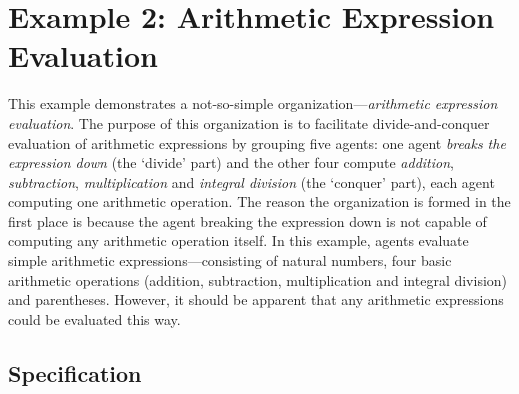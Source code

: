 
\section{Example 2: Arithmetic Expression Evaluation}

This example demonstrates a not-so-simple organization---\textit{arithmetic expression evaluation}.
The purpose of this organization is to facilitate divide-and-conquer evaluation of arithmetic expressions by grouping five agents: one agent \textit{breaks the expression down} (the `divide' part) and the other four compute \textit{addition}, \textit{subtraction}, \textit{multiplication} and \textit{integral division} (the `conquer' part), each agent computing one arithmetic operation.
The reason the organization is formed in the first place is because the agent breaking the expression down is not capable of computing any arithmetic operation itself.
In this example, agents evaluate simple arithmetic expressions---consisting of natural numbers, four basic arithmetic operations (addition, subtraction, multiplication and integral division) and parentheses. However, it should be apparent that any arithmetic expressions could be evaluated this way.

\subsection*{Specification}

